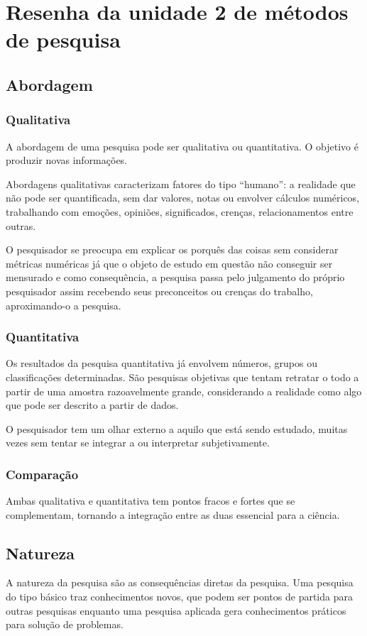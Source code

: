\section{Resenha da unidade 2 de métodos de pesquisa}


\subsection{Abordagem}
\subsubsection{Qualitativa}

A abordagem de uma pesquisa pode ser qualitativa ou quantitativa. O objetivo é produzir novas informações.

Abordagens qualitativas caracterizam fatores do tipo “humano”: a realidade que não pode ser quantificada, sem dar valores, notas ou envolver cálculos numéricos, trabalhando com emoções, opiniões, significados, crenças, relacionamentos entre outras. 

O pesquisador se preocupa em explicar os porquês das coisas sem considerar métricas numéricas já que o objeto de estudo em questão não conseguir ser mensurado e como consequência, a pesquisa passa pelo julgamento do próprio pesquisador assim recebendo seus preconceitos ou crenças do trabalho, aproximando-o a pesquisa.

\subsubsection{Quantitativa}
Os resultados da pesquisa quantitativa já envolvem números, grupos ou classificações determinadas. São pesquisas objetivas que tentam retratar o todo a partir de uma amostra razoavelmente grande, considerando a realidade como algo que pode ser descrito a partir de dados.

O pesquisador tem um olhar externo a aquilo que está sendo estudado, muitas vezes sem tentar se integrar a ou interpretar subjetivamente.

\subsubsection{Comparação}
Ambas qualitativa e quantitativa tem pontos fracos e fortes que se complementam,     tornando a integração entre as duas essencial para a ciência.


\subsection{Natureza}
A natureza da pesquisa são as consequências diretas da pesquisa. Uma pesquisa do tipo básico traz conhecimentos novos, que podem ser pontos de partida para outras pesquisas enquanto uma pesquisa aplicada gera conhecimentos práticos para solução de problemas.

